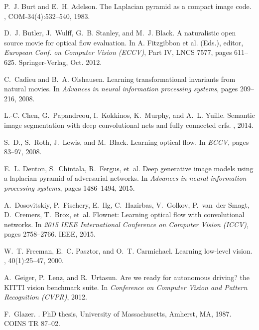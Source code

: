 \documentclass[10pt,twocolumn,letterpaper]{article}
\begin{document}
\begin{thebibliography}{10}
P.~J. Burt and E.~H. Adelson.
\newblock The {Laplacian} pyramid as a compact image code.
, COM-34(4):532--540, 1983.

D.~J. Butler, J.~Wulff, G.~B. Stanley, and M.~J. Black.
\newblock A naturalistic open source movie for optical flow evaluation.
\newblock In {A. Fitzgibbon et al. (Eds.)}, editor, {\em European Conf. on
  Computer Vision (ECCV)}, Part IV, LNCS 7577, pages 611--625. Springer-Verlag,
  Oct. 2012.

C.~Cadieu and B.~A. Olshausen.
\newblock Learning transformational invariants from natural movies.
\newblock In {\em Advances in neural information processing systems}, pages
  209--216, 2008.

L.-C. Chen, G.~Papandreou, I.~Kokkinos, K.~Murphy, and A.~L. Yuille.
\newblock Semantic image segmentation with deep convolutional nets and fully
  connected crfs.
, 2014.

S.~D., S.~Roth, J.~Lewis, and M.~Black.
\newblock Learning optical flow.
\newblock In {\em ECCV}, pages 83--97, 2008.

E.~L. Denton, S.~Chintala, R.~Fergus, et~al.
\newblock Deep generative image models using a laplacian pyramid of adversarial
  networks.
\newblock In {\em Advances in neural information processing systems}, pages
  1486--1494, 2015.

A.~Dosovitskiy, P.~Fischery, E.~Ilg, C.~Hazirbas, V.~Golkov, P.~van~der Smagt,
  D.~Cremers, T.~Brox, et~al.
\newblock Flownet: Learning optical flow with convolutional networks.
\newblock In {\em 2015 IEEE International Conference on Computer Vision
  (ICCV)}, pages 2758--2766. IEEE, 2015.

W.~T. Freeman, E.~C. Pasztor, and O.~T. Carmichael.
\newblock Learning low-level vision.
, 40(1):25--47, 2000.

A.~Geiger, P.~Lenz, and R.~Urtasun.
\newblock Are we ready for autonomous driving? the {KITTI} vision benchmark
  suite.
\newblock In {\em Conference on Computer Vision and Pattern Recognition
  (CVPR)}, 2012.

F.~Glazer.
.
\newblock PhD thesis, University of Massachusetts, Amherst, MA, 1987.
\newblock COINS TR 87--02.


\end{thebibliography}
\end{document}
